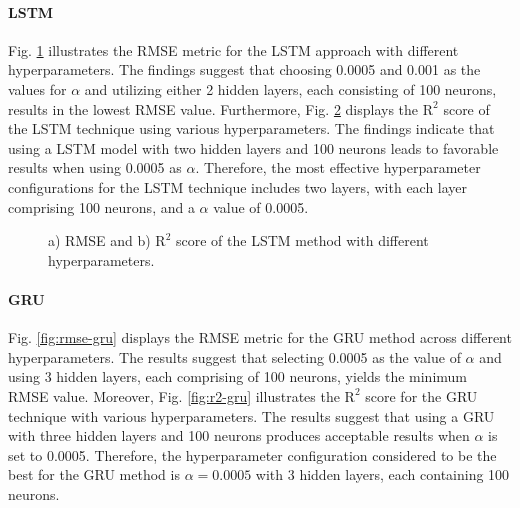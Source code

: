 \documentclass[journal,onecolumn]{IEEEtran}
\begin{document}
{\begin{appendices}
\paragraph{LSTM}
Fig. \ref{fig:rmse-lstm} illustrates the RMSE metric for the LSTM approach with different hyperparameters. The findings suggest that choosing 0.0005 and 0.001 as the values for $\alpha$ and utilizing either 2 hidden layers, each consisting of 100 neurons, results in the lowest RMSE value. Furthermore, Fig. \ref{fig:r2-lstm} displays the $\text{R}^2$ score of the LSTM technique using various hyperparameters. The findings indicate that using a LSTM model with two hidden layers and 100 neurons leads to favorable results when using 0.0005 as $\alpha$. Therefore, the most effective hyperparameter configurations for the LSTM technique includes two layers, with each layer comprising 100 neurons, and a $\alpha$ value of 0.0005.

\begin{figure}[htbp]
    \centering
    \begin{subfigure}[b]{0.5\linewidth}
        \centering
        
        \caption{}
        \label{fig:rmse-lstm}
    \end{subfigure}%
    \begin{subfigure}[b]{0.5\linewidth}
        \centering
        
        \caption{}
        \label{fig:r2-lstm}
    \end{subfigure}
    \caption{a) RMSE and b) $\text{R}^2$ score of the LSTM method with different hyperparameters.}
    \label{fig:lstm-hypers}
\end{figure}

\paragraph{GRU}
Fig. \ref{fig:rmse-gru} displays the RMSE metric for the GRU method across different hyperparameters. The results suggest that selecting 0.0005 as the value of $\alpha$ and using 3 hidden layers, each comprising of 100 neurons, yields the minimum RMSE value. Moreover, Fig. \ref{fig:r2-gru} illustrates the $\text{R}^2$ score for the GRU technique with various hyperparameters. The results suggest that using a GRU with three hidden layers and 100 neurons produces acceptable results when $\alpha$ is set to 0.0005. Therefore, the hyperparameter configuration considered to be the best for the GRU method is $\alpha=0.0005$ with 3 hidden layers, each containing 100 neurons.


\end{appendices}}
\end{document}
